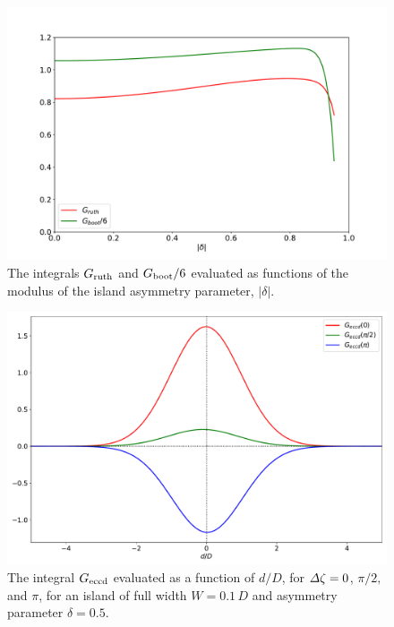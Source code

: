 \documentclass[12pt,prb,aps]{revtex4-1}
\begin{document}
\begin{figure}
\centerline{\includegraphics[width=\textwidth]{G.pdf}}
\caption{The integrals $G_{\rm ruth}$ and $G_{\rm boot}/6$ evaluated as functions of the modulus of the island asymmetry parameter, $|\delta|$.  \label{fig6}}
\end{figure}

\begin{figure}
\centerline{\includegraphics[width=\textwidth]{W01.pdf}}
\caption{The integral $G_{\rm eccd}$ evaluated as a function of $d/D$, for ${\mit\Delta}\zeta = 0$, $\pi/2,$ and $\pi$, for an  island
of full width $W=0.1\,D$ and asymmetry parameter $\delta=0.5$. \label{fig7}}
\end{figure}
\end{document}

